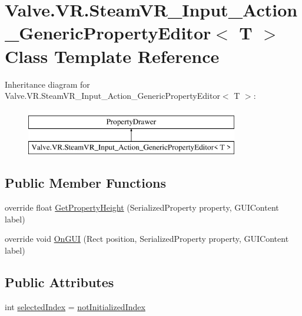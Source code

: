 \hypertarget{class_valve_1_1_v_r_1_1_steam_v_r___input___action___generic_property_editor}{}\section{Valve.\+V\+R.\+Steam\+V\+R\+\_\+\+Input\+\_\+\+Action\+\_\+\+Generic\+Property\+Editor$<$ T $>$ Class Template Reference}
\label{class_valve_1_1_v_r_1_1_steam_v_r___input___action___generic_property_editor}
Inheritance diagram for Valve.\+V\+R.\+Steam\+V\+R\+\_\+\+Input\+\_\+\+Action\+\_\+\+Generic\+Property\+Editor$<$ T $>$\+:\begin{figure}[H]
\begin{center}
\leavevmode
\includegraphics[height=2.000000cm]{class_valve_1_1_v_r_1_1_steam_v_r___input___action___generic_property_editor}
\end{center}
\end{figure}
\subsection*{Public Member Functions}
\begin{DoxyCompactItemize}
\item 
override float \mbox{\hyperlink{class_valve_1_1_v_r_1_1_steam_v_r___input___action___generic_property_editor_ab201369606d4e98797306901633e6f2a}{Get\+Property\+Height}} (Serialized\+Property property, G\+U\+I\+Content label)
\item 
override void \mbox{\hyperlink{class_valve_1_1_v_r_1_1_steam_v_r___input___action___generic_property_editor_a4e85201555d8fa558345c09e76cdea32}{On\+G\+UI}} (Rect position, Serialized\+Property property, G\+U\+I\+Content label)
\end{DoxyCompactItemize}
\subsection*{Public Attributes}
\begin{DoxyCompactItemize}
\item 
int \mbox{\hyperlink{class_valve_1_1_v_r_1_1_steam_v_r___input___action___generic_property_editor_ac15054d907ad9e3cd1b91d8b4bc0e7af}{selected\+Index}} = \mbox{\hyperlink{class_valve_1_1_v_r_1_1_steam_v_r___input___action___generic_property_editor_ab14e59839e0fa1be62631b32eaf40f39}{not\+Initialized\+Index}}
\end{DoxyCompactItemize}
